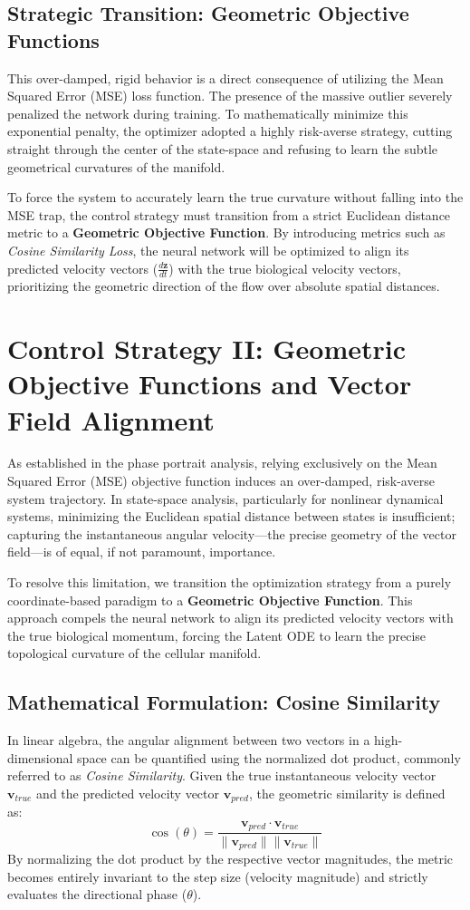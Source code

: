 \documentclass[12pt, a4paper]{article}
\begin{document}
	\subsection{Strategic Transition: Geometric Objective Functions}
	This over-damped, rigid behavior is a direct consequence of utilizing the Mean Squared Error (MSE) loss function. The presence of the massive outlier severely penalized the network during training. To mathematically minimize this exponential penalty, the optimizer adopted a highly risk-averse strategy, cutting straight through the center of the state-space and refusing to learn the subtle geometrical curvatures of the manifold.
	
	To force the system to accurately learn the true curvature without falling into the MSE trap, the control strategy must transition from a strict Euclidean distance metric to a \textbf{Geometric Objective Function}. By introducing metrics such as \textit{Cosine Similarity Loss}, the neural network will be optimized to align its predicted velocity vectors ($\frac{d\mathbf{z}}{dt}$) with the true biological velocity vectors, prioritizing the geometric direction of the flow over absolute spatial distances.
	
	\section{Control Strategy II: Geometric Objective Functions and Vector Field Alignment}
	
	As established in the phase portrait analysis, relying exclusively on the Mean Squared Error (MSE) objective function induces an over-damped, risk-averse system trajectory. In state-space analysis, particularly for nonlinear dynamical systems, minimizing the Euclidean spatial distance between states is insufficient; capturing the instantaneous angular velocity—the precise geometry of the vector field—is of equal, if not paramount, importance.
	
	To resolve this limitation, we transition the optimization strategy from a purely coordinate-based paradigm to a \textbf{Geometric Objective Function}. This approach compels the neural network to align its predicted velocity vectors with the true biological momentum, forcing the Latent ODE to learn the precise topological curvature of the cellular manifold.
	
	\subsection{Mathematical Formulation: Cosine Similarity}
	In linear algebra, the angular alignment between two vectors in a high-dimensional space can be quantified using the normalized dot product, commonly referred to as \textit{Cosine Similarity}. Given the true instantaneous velocity vector $\mathbf{v}_{true}$ and the predicted velocity vector $\mathbf{v}_{pred}$, the geometric similarity is defined as:
	$$ \cos(\theta) = \frac{\mathbf{v}_{pred} \cdot \mathbf{v}_{true}}{\|\mathbf{v}_{pred}\| \|\mathbf{v}_{true}\|} $$
	By normalizing the dot product by the respective vector magnitudes, the metric becomes entirely invariant to the step size (velocity magnitude) and strictly evaluates the directional phase ($\theta$). 
	
\end{document}
